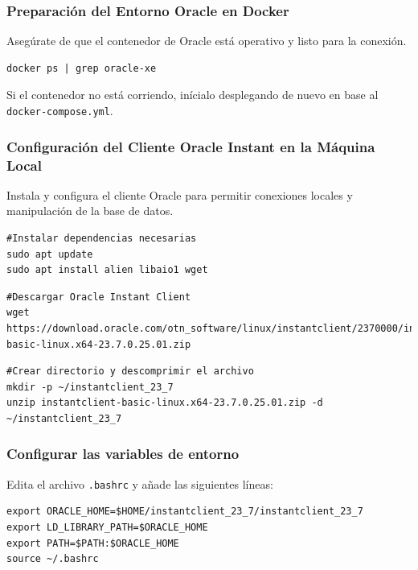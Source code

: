 \documentclass{article}
\begin{document}
\subsubsection{Preparación del Entorno Oracle en Docker}
Asegúrate de que el contenedor de Oracle está operativo y listo para la conexión.

\begin{lstlisting}[style=bashStyle]
docker ps | grep oracle-xe
\end{lstlisting}
Si el contenedor no está corriendo, inícialo desplegando de nuevo en base al \texttt{docker-compose.yml}.

\subsubsection{Configuración del Cliente Oracle Instant en la Máquina Local}
Instala y configura el cliente Oracle para permitir conexiones locales y manipulación de la base de datos.

\begin{lstlisting}[style=bashStyle]
#Instalar dependencias necesarias
sudo apt update
sudo apt install alien libaio1 wget
\end{lstlisting}

\begin{lstlisting}[style=bashStyle]
#Descargar Oracle Instant Client
wget https://download.oracle.com/otn_software/linux/instantclient/2370000/instantclient-basic-linux.x64-23.7.0.25.01.zip
\end{lstlisting}

\begin{lstlisting}[style=bashStyle]
#Crear directorio y descomprimir el archivo
mkdir -p ~/instantclient_23_7
unzip instantclient-basic-linux.x64-23.7.0.25.01.zip -d ~/instantclient_23_7
\end{lstlisting}

\subsubsection{Configurar las variables de entorno}

Edita el archivo \texttt{.bashrc} y añade las siguientes líneas:

\begin{lstlisting}[style=bashStyle]
export ORACLE_HOME=$HOME/instantclient_23_7/instantclient_23_7
export LD_LIBRARY_PATH=$ORACLE_HOME
export PATH=$PATH:$ORACLE_HOME
source ~/.bashrc
\end{lstlisting}
\end{document}
